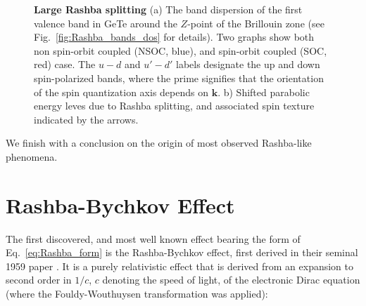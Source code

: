 \begin{figure}[h]
	\begin{subfigure}[b]{0.49\textwidth}
	\caption{}
	\end{subfigure}
	\begin{subfigure}[b]{0.49\textwidth}
	\caption{}
	\end{subfigure}
	\caption{\label{fig:Rashba_intro_dispersion}
		{\bf Large Rashba splitting} (a) The band dispersion of the first valence band in GeTe around the $Z$-point of the Brillouin zone (see Fig.~\ref{fig:Rashba_bands_dos} for details). Two graphs show both non spin-orbit coupled (NSOC, blue), and spin-orbit coupled (SOC, red) case. The $u-d$ and $u'-d'$ labels designate the up and down spin-polarized bands, where the prime signifies that the orientation of the spin quantization axis depends on $\bm{k}$. b) Shifted parabolic energy leves due to Rashba splitting, and associated spin texture indicated by the arrows.}
\end{figure}

We finish with a conclusion on the origin of most observed Rashba-like phenomena.

\section{Rashba-Bychkov Effect \label{sec:Rashba_relativistic}}
The first discovered, and most well known effect bearing the form of Eq.~\ref{eq:Rashba_form} is the Rashba-Bychkov effect, first derived in their seminal 1959 paper \cite{Rashba1959SymmetryAr}.
It is a purely relativistic effect that is derived from an expansion to second order in $1/c$, $c$ denoting the speed of light, of the electronic Dirac equation (where the Fouldy-Wouthuysen transformation was applied):

